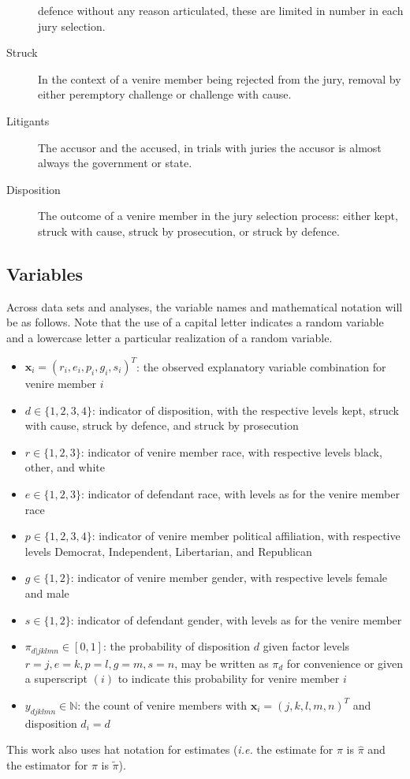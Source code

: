 \begin{description}
  defence without any reason articulated, these are limited in number
  in each jury selection.
\item[Struck] In the context of a venire member being rejected from the jury, removal by either peremptory challenge or challenge
  with cause.
\item[Litigants] The accusor and the accused, in trials with juries the accusor is almost always the government or state.
\item[Disposition] The outcome of a venire member in the jury selection process: either kept, struck with cause, struck by
  prosecution, or struck by defence.
\end{description}

\subsection{Variables} \label{not:variables}

Across data sets and analyses, the variable names and mathematical notation will be as follows. Note that the use of a capital
letter indicates a random variable and a lowercase letter a particular realization of a random variable.

\begin{itemize}
\item $\mathbf{x}_i = (r_i,e_i,p_i,g_i,s_i)^T$: the observed explanatory variable combination for venire member $i$
\item $d \in \{1,2,3,4\}$: indicator of disposition, with the respective levels kept, struck with cause, struck by defence,
  and struck by prosecution
\item $r \in \{1,2,3\}$: indicator of venire member race, with respective levels black, other, and white
\item $e \in \{1,2,3\}$: indicator of defendant race, with levels as for the venire member race
\item $p \in \{1,2,3,4\}$: indicator of venire member political affiliation, with respective levels Democrat, Independent,
  Libertarian, and Republican
\item $g \in \{1,2\}$: indicator of venire member gender, with respective levels female and male
\item $s \in \{1,2\}$: indicator of defendant gender, with levels as for the venire member
\item $\pi_{d|jklmn} \in [0,1]$: the probability of disposition $d$ given factor levels $r = j, e = k, p = l, g = m, s = n$, may
  be written as $\pi_d$ for convenience or given a superscript $(i)$ to indicate this probability for venire member $i$
\item $y_{djklmn} \in \mathbb{N}$: the count of venire members with
  $\textbf{x}_i = (j,k,l,m,n)^T$ and disposition $d_i = d$
\end{itemize}

This work also uses hat notation for estimates (\textit{i.e.} the estimate for $\pi$ is $\hat{\pi}$ and the estimator for $\pi$ is
$\tilde{\pi}$).

